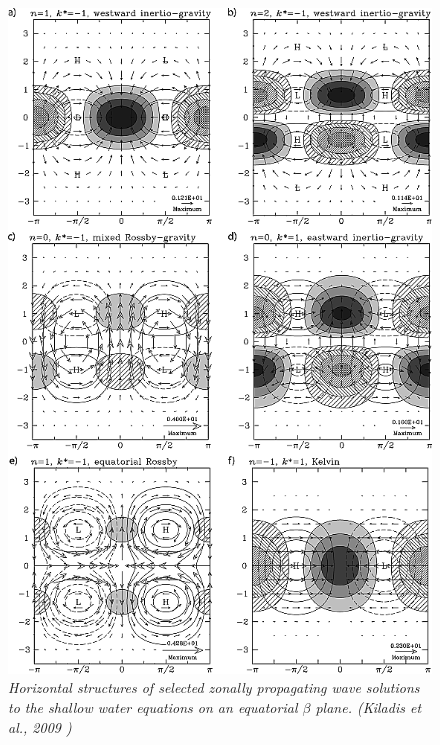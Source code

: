 \begin{figure}[ht!]
    \centering
    \includegraphics[height=0.7\textheight]{graphics/rog1687-fig-0003.png}
    \caption{\textit{Horizontal structures of selected zonally propagating wave solutions to the shallow water equations on an equatorial $\beta$ plane. (Kiladis et al., 2009 \cite{https://doi.org/10.1029/2008RG000266})}}
\end{figure}

